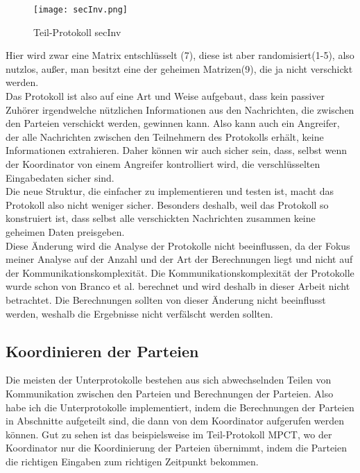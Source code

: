 \begin{figure}[h]
\begin{center}
\texttt{[image: secInv.png]}
\caption{Teil-Protokoll secInv}
\cite{Doettling2021}
\label{oInv}
\end{center}

\end{figure}

Hier wird zwar eine Matrix entschlüsselt (7), diese ist aber randomisiert(1-5), also nutzlos, außer, man besitzt eine der geheimen Matrizen(9), die ja nicht verschickt werden.\\
Das Protokoll ist also auf eine Art und Weise aufgebaut, dass kein passiver Zuhörer irgendwelche nützlichen Informationen aus den Nachrichten, die zwischen den Parteien verschickt werden, gewinnen kann. Also kann auch ein Angreifer, der alle Nachrichten zwischen den Teilnehmern des Protokolls erhält, keine Informationen extrahieren. Daher können wir auch sicher sein, dass, selbst wenn der Koordinator von einem Angreifer kontrolliert wird, die verschlüsselten Eingabedaten sicher sind.\\
Die neue Struktur, die einfacher zu implementieren und testen ist, macht das Protokoll also nicht weniger sicher. Besonders deshalb, weil das Protokoll so konstruiert ist, dass selbst alle verschickten Nachrichten zusammen keine geheimen Daten preisgeben.\\
Diese Änderung wird die Analyse der Protokolle nicht beeinflussen, da der Fokus meiner Analyse auf der Anzahl und der Art der Berechnungen liegt und nicht auf der Kommunikationskomplexität. Die Kommunikationskomplexität der Protokolle wurde schon von Branco et al. berechnet und wird deshalb in dieser Arbeit nicht betrachtet. Die Berechnungen sollten von dieser Änderung nicht beeinflusst werden, weshalb die Ergebnisse nicht verfälscht werden sollten.

\subsection{Koordinieren der Parteien}
Die meisten der Unterprotokolle bestehen aus sich abwechselnden Teilen von Kommunikation zwischen den Parteien und Berechnungen der Parteien. Also habe ich die Unterprotokolle implementiert, indem die Berechnungen der Parteien in Abschnitte aufgeteilt sind, die dann von dem Koordinator aufgerufen werden können. Gut zu sehen ist das beispielsweise im Teil-Protokoll MPCT, wo der Koordinator nur die Koordinierung der Parteien übernimmt, indem die Parteien die richtigen Eingaben zum richtigen Zeitpunkt bekommen.\\


